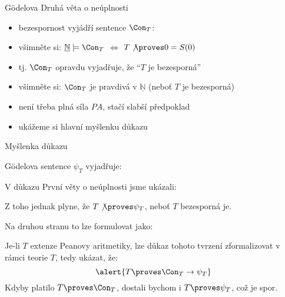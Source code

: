 \documentclass{beamer}
\begin{document}
\begin{frame}{Gödelova Druhá věta o neúplnosti}
    
    \pause

    \pause
    \begin{itemize}
        \item bezespornost vyjádří sentence \alert{$\Con_T$}:\hfill {} \pause 
        \item všimněte si: $\underline{\mathbb N}\models\Con_T$ $\Leftrightarrow$ $T\not\proves 0=S(0)$\pause
        \item tj. $\Con_T$ opravdu vyjadřuje, že \alert{``$T$ je bezesporná''}
    \end{itemize}

    \bigskip
    \pause

    \medskip

    \pause
    \begin{itemize}
        \item všimněte si: \alert{$\Con_T$ je pravdivá v $\underline{\mathbb N}$} (neboť $T$ je bezesporná)\pause
        \item není třeba plná síla $PA$, stačí slabší předpoklad\pause
        \item ukážeme si hlavní myšlenku důkazu
    \end{itemize}
    
\end{frame}


\begin{frame}{Myšlenka důkazu}

    \pause
    Gödelova sentence $\psi_T$ vyjadřuje: 
    
    \pause
    V důkazu První věty o neúplnosti jsme ukázali:

    
    \pause
    Z toho jednak plyne, že $T\not\proves\psi_T$, neboť $T$ bezesporná je. 
    
    \pause
    Na druhou stranu to lze formulovat jako: 
    
    \pause
    Je-li $T$ extenze Peanovy aritmetiky, lze důkaz tohoto tvrzení zformalizovat v rámci teorie $T$, tedy ukázat, že:
    $$
    \alert{ T\proves\Con_T\to\psi_T}
    $$
    \pause
    Kdyby platilo $T\proves\Con_T$, dostali bychom i $T\proves\psi_T$, což je spor.
    \hfill\qedsymbol

\end{frame}
\end{document}
